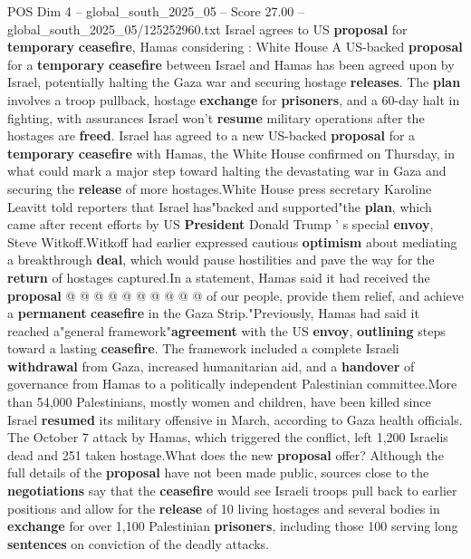 \begin{textsample}{POS Dim 4 – global\_south\_2025\_05 – Score 27.00 – global\_south\_2025\_05/125252960.txt}  \label{ex:f4_pos_091}
Israel agrees to US \textbf{proposal} for \textbf{temporary} \textbf{ceasefire}, Hamas considering : White House A US-backed \textbf{proposal} for a \textbf{temporary} \textbf{ceasefire} between Israel and Hamas has been agreed upon by Israel, potentially halting the Gaza war and securing hostage \textbf{releases}.
The \textbf{plan} involves a troop pullback, hostage \textbf{exchange} for \textbf{prisoners}, and a 60-day halt in fighting, with assurances Israel won't \textbf{resume} military operations after the hostages are \textbf{freed}.
Israel has agreed to a new US-backed \textbf{proposal} for a \textbf{temporary} \textbf{ceasefire} with Hamas, the White House confirmed on Thursday, in what could mark a major step toward halting the devastating war in Gaza and securing the \textbf{release} of more hostages.White House press secretary Karoline Leavitt told reporters that Israel has"backed and supported"the \textbf{plan}, which came after recent efforts by US \textbf{President} Donald Trump ' s special \textbf{envoy}, Steve Witkoff.Witkoff had earlier expressed cautious \textbf{optimism} about mediating a breakthrough \textbf{deal}, which would pause hostilities and pave the way for the \textbf{return} of hostages captured.In a statement, Hamas said it had received the \textbf{proposal} @ @ @ @ @ @ @ @ @ @ of our people, provide them relief, and achieve a \textbf{permanent} \textbf{ceasefire} in the Gaza Strip."Previously, Hamas had said it reached a"general framework"\textbf{agreement} with the US \textbf{envoy}, \textbf{outlining} steps toward a lasting \textbf{ceasefire}.
The framework included a complete Israeli \textbf{withdrawal} from Gaza, increased humanitarian aid, and a \textbf{handover} of governance from Hamas to a politically independent Palestinian committee.More than 54,000 Palestinians, mostly women and children, have been killed since Israel \textbf{resumed} its military offensive in March, according to Gaza health officials.
The October 7 attack by Hamas, which triggered the conflict, left 1,200 Israelis dead and 251 taken hostage.What does the new \textbf{proposal} offer?
Although the full details of the \textbf{proposal} have not been made public, sources close to the \textbf{negotiations} say that the \textbf{ceasefire} would see Israeli troops pull back to earlier positions and allow for the \textbf{release} of 10 living hostages and several bodies in \textbf{exchange} for over 1,100 Palestinian \textbf{prisoners}, including those 100 serving long \textbf{sentences} on conviction of the deadly attacks.

\end{textsample}
